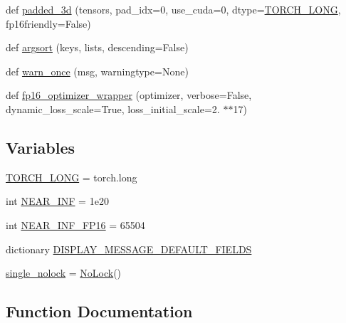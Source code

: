 \begin{DoxyCompactItemize}
\item 
def \hyperlink{namespaceparlai_1_1utils_1_1misc_ad96b0c9ef6237d9ca051251089faf2c7}{padded\+\_\+3d} (tensors, pad\+\_\+idx=0, use\+\_\+cuda=0, dtype=\hyperlink{namespaceparlai_1_1utils_1_1misc_ac49ec9bcd5fe586085eb9fab8f40fdb5}{T\+O\+R\+C\+H\+\_\+\+L\+O\+NG}, fp16friendly=False)
\item 
def \hyperlink{namespaceparlai_1_1utils_1_1misc_a9e330c9119522333c738a3175e0b4396}{argsort} (keys, lists, descending=False)
\item 
def \hyperlink{namespaceparlai_1_1utils_1_1misc_acf146e70ea7f6867969a7c2b545d4b4b}{warn\+\_\+once} (msg, warningtype=None)
\item 
def \hyperlink{namespaceparlai_1_1utils_1_1misc_a7836ac7469dc5744e0ad9e5e54da2396}{fp16\+\_\+optimizer\+\_\+wrapper} (optimizer, verbose=False, dynamic\+\_\+loss\+\_\+scale=True, loss\+\_\+initial\+\_\+scale=2. $\ast$$\ast$17)
\end{DoxyCompactItemize}
\subsection*{Variables}
\begin{DoxyCompactItemize}
\item 
\hyperlink{namespaceparlai_1_1utils_1_1misc_ac49ec9bcd5fe586085eb9fab8f40fdb5}{T\+O\+R\+C\+H\+\_\+\+L\+O\+NG} = torch.\+long
\item 
int \hyperlink{namespaceparlai_1_1utils_1_1misc_a7f43cea0de3a37889ef23f275831ff92}{N\+E\+A\+R\+\_\+\+I\+NF} = 1e20
\item 
int \hyperlink{namespaceparlai_1_1utils_1_1misc_a8f8b31dbd6331077648288e004f45ff9}{N\+E\+A\+R\+\_\+\+I\+N\+F\+\_\+\+F\+P16} = 65504
\item 
dictionary \hyperlink{namespaceparlai_1_1utils_1_1misc_a3817c467f1d894060a5f5b3954d99598}{D\+I\+S\+P\+L\+A\+Y\+\_\+\+M\+E\+S\+S\+A\+G\+E\+\_\+\+D\+E\+F\+A\+U\+L\+T\+\_\+\+F\+I\+E\+L\+DS}
\item 
\hyperlink{namespaceparlai_1_1utils_1_1misc_a5d6ad7f3aef96f16bb9060f5a41fc39b}{single\+\_\+nolock} = \hyperlink{classparlai_1_1utils_1_1misc_1_1NoLock}{No\+Lock}()
\end{DoxyCompactItemize}


\subsection{Function Documentation}
\mbox{\label{namespaceparlai_1_1utils_1_1misc_a9e330c9119522333c738a3175e0b4396}} 
